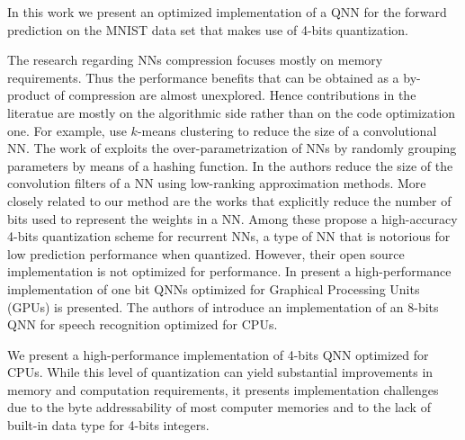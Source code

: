In this work we present an optimized implementation of a QNN for the forward prediction on the MNIST data set that makes use of  4-bits quantization. 

%
%

 The research regarding NNs compression focuses mostly on memory requirements. Thus the performance benefits that can be obtained as a by-product of compression are almost  unexplored. Hence   contributions in the literatue are mostly on the algorithmic side rather than on the code optimization one. For example, \cite{gong_compressing_2014} use $k$-means clustering to reduce the size of  a convolutional NN. The work of \cite{chen_compressing_2015} exploits the over-parametrization of NNs by randomly grouping parameters by means of a hashing function. In \cite{denton_exploiting_2014} the authors reduce the size of the convolution filters of a NN using low-ranking approximation methods.	More closely related to our method are the works that explicitly reduce the number of bits used to represent the weights in a NN. Among these \cite{he_effective_2016} propose a high-accuracy  4-bits quantization scheme for recurrent NNs, a type of NN that is notorious for low prediction performance when quantized. However, their open source implementation is not optimized for performance. In \cite{hubara_binarized_2016} present a high-performance implementation of one bit QNNs optimized for Graphical Processing Units (GPUs) is presented. The authors of \cite{vanhoucke_improving_2011} introduce an implementation of an  8-bits QNN for speech recognition optimized for CPUs.

We present a high-performance implementation of  4-bits QNN optimized for CPUs. While this level of quantization can yield substantial improvements in memory and computation requirements, it presents implementation challenges due to the byte addressability of most computer memories and to the lack of built-in data type for  4-bits integers.


